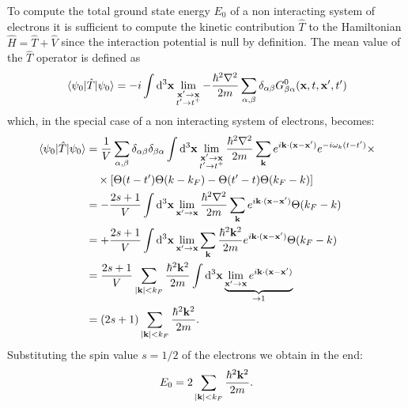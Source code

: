 \documentclass[a4paper]{article}
\begin{document}
\medskip
To compute the total ground state energy $E_0$ of a non interacting system of electrons it is sufficient to compute the kinetic contribution $\hat{T}$ to the Hamiltonian $\hat{H} = \hat{T} + \hat{V}$ since the interaction potential is null by definition.
The mean value of the $\hat{T}$ operator is defined as
\begin{equation}
\mel{\psi_0}{\hat{T}}{\psi_0} = -i\int \dd[3]{\vb{x}} \lim_{\substack{\vb{x}'\rightarrow\vb{x}\\t'\rightarrow t^+}} -\frac{\hbar^2\nabla^2}{2m}\sum_{\alpha,\beta}\delta_{\alpha\beta}G^0_{\beta\alpha}\pqty{\vb{x},t,\vb{x}',t'}
\end{equation}
which, in the special case of a non interacting system of electrons, becomes:
\begin{align}
\mel{\psi_0}{\hat{T}}{\psi_0} &=\frac{1}{V}\sum_{\alpha,\beta}\delta_{\alpha\beta}\delta_{\beta\alpha} \int \dd[3]{\vb{x}}\lim_{\substack{\vb{x}'\rightarrow\vb{x}\\t'\rightarrow t^+}} \frac{\hbar^2\nabla^2}{2m} \sum_{\vb{k}}  e^{i\vb{k}\cdot(\vb{x} - \vb{x'})}e^{-i\omega_k (t-t')} \times\\
&\quad\times\bqty{\Theta(t-t')\Theta(k-k_F) - \Theta(t'-t)\Theta(k_F - k)}\\
&= -\frac{2s+1}{V}\int \dd[3]{\vb{x}} \lim_{\vb{x}'\rightarrow\vb{x}} \frac{\hbar^2\nabla^2}{2m} \sum_{\vb{k}}  e^{i\vb{k}\cdot(\vb{x} - \vb{x'})}\Theta(k_F - k)\\
&= +\frac{2s+1}{V}\int \dd[3]{\vb{x}} \lim_{\vb{x}'\rightarrow\vb{x}} \sum_{\vb{k}} \frac{\hbar^2\vb{k}^2}{2m}   e^{i\vb{k}\cdot(\vb{x} - \vb{x'})}\Theta(k_F - k)\\
&=\frac{2s+1}{V} \sum_{\abs{\vb{k}}<k_F} \frac{\hbar^2\vb{k}^2}{2m} \int \dd[3]{\vb{x}} \underbrace{\lim_{\vb{x}'\rightarrow\vb{x}} e^{i\vb{k}\cdot(\vb{x} - \vb{x'})}}_{\rightarrow 1}\\
&= \pqty{2s+1} \sum_{\abs{\vb{k}}<k_F} \frac{\hbar^2\vb{k}^2}{2m}.
\end{align}
Substituting the spin value $s=1/2$ of the electrons we obtain in the end:
\begin{equation}
E_0 = 2 \sum_{\abs{\vb{k}}<k_F} \frac{\hbar^2\vb{k}^2}{2m}.
\end{equation}
\end{document}
